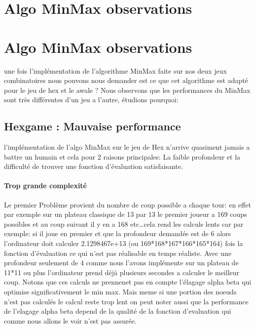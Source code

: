 \section{Algo MinMax observations}






\section{Algo MinMax observations}
une fois l'implémentation de l'algorithme MinMax faite sur nos deux
jeux combinatoires nous pouvons nous demander est ce que cet algorithme est adapté pour le jeu de hex et le awale ?
Nous observons que les performances du MinMax sont très différentes d'un jeu a l'autre, étudions pourquoi:

\subsection {Hexgame : Mauvaise performance}
l'implémentation de l'algo MinMax sur le jeu de Hex n'arrive quasiment jamais a battre un humain et cela pour 
2 raisons principales: La faible profondeur et la difficulté de trouver une fonction d'évaluation satisfaisante.
\paragraph {Trop grande complexité} Le premier Problème provient du nombre de coup possible a chaque tour: 
en effet par exemple sur un plateau classique de 13 par 13 le premier joueur a 169 coups possibles et au coup suivant
il y en a 168 etc\dots cela rend les calculs lents car par exemple: si il joue en premier 
et que la profondeur demandée est de 6 alors l'ordinateur doit calculer 2.1298467e+13 (ou 169*168*167*166*165*164) 
fois la fonction d'évaluation ce qui n'est pas réalisable en temps réaliste. Avec une profondeur seulement de 
4 comme nous l'avons implémente sur un plateau de 11*11 ou plus l'ordinateur prend déjà plusieurs 
secondes a calculer le meilleur coup. Notons que ces calculs ne prennenet pas en compte l'élagage alpha beta
qui optimise significativement le min max. Mais meme si une portion des noeuds n'est pas calculés le calcul reste trop lent
on peut noter aussi que la performance de l'elagage alpha beta depend de la qualité de la fonction d'evaluation qui comme nous allons
le voir n'est pas assurée.


